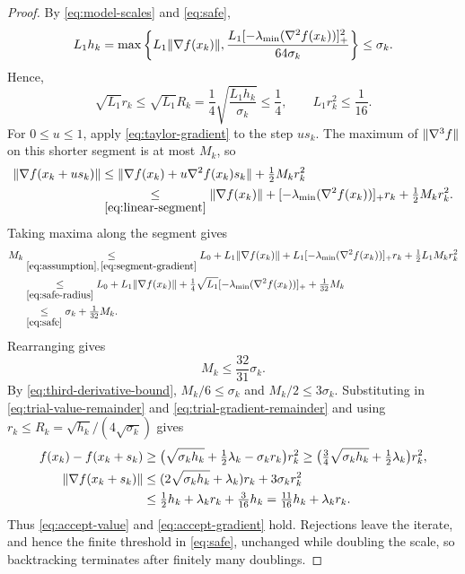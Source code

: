 \begin{proof}
By \eqref{eq:model-scales} and \eqref{eq:safe},
\[
 L_1h_k
 =\max\left\{L_1\lVert\nabla f(x_k)\rVert,
       \frac{L_1[-\lambda_{\min}(\nabla^2f(x_k))]_+^2}
            {64\sigma_k}\right\}
 \le\sigma_k.
\]
Hence,
\begin{equation}\label{eq:safe-radius}
 \sqrt{L_1}r_k
 \le\sqrt{L_1}R_k=
       \frac14\sqrt{\frac{L_1h_k}{\sigma_k}}
 \le\frac14,\qquad L_1r_k^2\le\frac1{16}.
\end{equation}
For $0\le u\le1$, apply \eqref{eq:taylor-gradient} to the step $us_k$.
The maximum of $\lVert\nabla^3f\rVert$ on this shorter segment is at most $M_k$, so
\begin{equation}\label{eq:segment-gradient}
 \begin{aligned}
 \lVert\nabla f(x_k+us_k)\rVert
 &\le\lVert\nabla f(x_k)+u\nabla^2f(x_k)s_k\rVert
       +\tfrac12M_kr_k^2\\
 &\underset{\eqref{eq:linear-segment}}{\le}
       \lVert\nabla f(x_k)\rVert
       +[-\lambda_{\min}(\nabla^2f(x_k))]_+r_k
       +\tfrac12M_kr_k^2.
 \end{aligned}
\end{equation}
Taking maxima along the segment gives
\[
 \begin{aligned}
 M_k
 &\underset{\eqref{eq:assumption},\,\eqref{eq:segment-gradient}}{\le}
       L_0+L_1\lVert\nabla f(x_k)\rVert
       +L_1[-\lambda_{\min}(\nabla^2f(x_k))]_+r_k
       +\tfrac12L_1M_kr_k^2\\
 &\underset{\eqref{eq:safe-radius}}{\le}
       L_0+L_1\lVert\nabla f(x_k)\rVert
       +\tfrac14\sqrt{L_1}[-\lambda_{\min}(\nabla^2f(x_k))]_+
       +\tfrac1{32}M_k\\
 &\underset{\eqref{eq:safe}}{\le}\sigma_k+\tfrac1{32}M_k.
 \end{aligned}
\]
Rearranging gives
\begin{equation}\label{eq:third-derivative-bound}
 M_k\le\frac{32}{31}\sigma_k.
\end{equation}
By \eqref{eq:third-derivative-bound}, $M_k/6\le\sigma_k$ and
$M_k/2\le3\sigma_k$. Substituting in
\eqref{eq:trial-value-remainder} and \eqref{eq:trial-gradient-remainder}
and using $r_k\le R_k=\sqrt{h_k}/(4\sqrt{\sigma_k})$ gives
\begin{align*}
 f(x_k)-f(x_k+s_k)
 &\ge \bigl(\sqrt{\sigma_kh_k}+\tfrac12\lambda_k-\sigma_kr_k\bigr)r_k^2
 \ge \bigl(\tfrac34\sqrt{\sigma_kh_k}+\tfrac12\lambda_k\bigr)r_k^2,\\
 \lVert\nabla f(x_k+s_k)\rVert
 &\le (2\sqrt{\sigma_kh_k}+\lambda_k)r_k+3\sigma_kr_k^2\\
 &\le \tfrac12h_k+\lambda_kr_k+\tfrac3{16}h_k
 =\tfrac{11}{16}h_k+\lambda_kr_k.
\end{align*}
Thus \eqref{eq:accept-value} and \eqref{eq:accept-gradient} hold.
Rejections leave the iterate, and hence the finite threshold in
\eqref{eq:safe}, unchanged while doubling the scale, so
backtracking terminates after finitely many doublings.
\end{proof}

